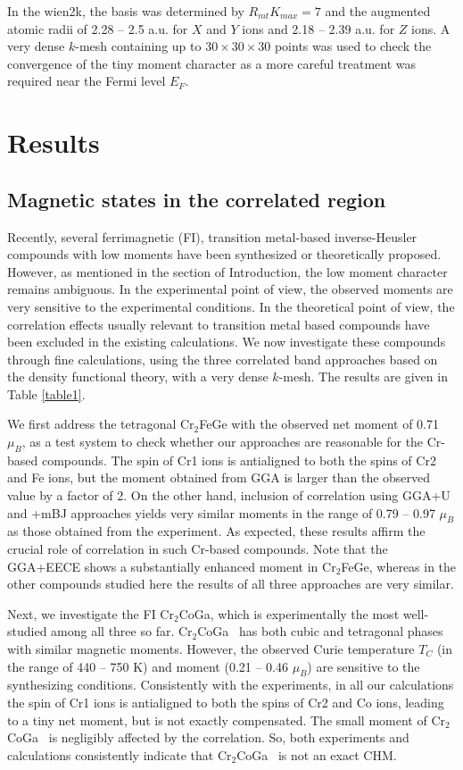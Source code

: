 \documentclass[preprint,5p]{elsarticle}
\newcommand{\ccg}{Cr$_2$CoGa}
\begin{document}
In the {\sc wien2k}, the basis was determined by $R_{mt}K_{max}=7$ 
and the augmented atomic radii of 2.28 -- 2.5 a.u. for $X$ and $Y$ ions and 2.18 -- 2.39 a.u. for $Z$ ions.
A very dense $k$-mesh containing up to $30\times30\times30$ points was used
to check the convergence of the tiny moment character 
as a more careful treatment was required near the Fermi level $E_F$.




\section{Results}

\subsection{Magnetic states in the correlated region}
Recently, several ferrimagnetic (FI), transition metal-based inverse-Heusler compounds 
with low moments have been synthesized or theoretically proposed.
However, as mentioned in the section of Introduction, 
the low moment character remains ambiguous.
In the experimental point of view,
the observed moments are very sensitive to the experimental conditions.
In the theoretical point of view,
the correlation effects usually relevant to transition metal based compounds 
have been excluded in the existing calculations.
We now investigate these compounds through fine calculations, 
using the three correlated band approaches based on the density functional theory,
with a very dense $k$-mesh. The results are given in Table \ref{table1}.

We first address the tetragonal Cr$_2$FeGe with the observed net moment of 0.71 $\mu_B$,\cite{hak13}
as a test system to check whether our approaches are reasonable for the Cr-based compounds.
The spin of Cr1 ions is antialigned to both the spins of Cr2 and Fe ions,
but the moment obtained from GGA is larger than the observed value by a factor of 2.
On the other hand, inclusion of correlation using GGA+U and +mBJ approaches 
yields very similar moments in the range of 0.79 -- 0.97 $\mu_B$ 
as those obtained from the experiment.
As expected, these results affirm the crucial role of correlation in such Cr-based compounds.
Note that the GGA+EECE shows a substantially enhanced moment in Cr$_2$FeGe, 
whereas in the other compounds studied here the results of all three approaches are very similar.

Next, we investigate the FI \ccg, which is experimentally the most well-studied among all three so far. 
\ccg~ has both cubic and tetragonal phases with similar magnetic moments.\cite{feng15, deka16,jamer16}
However, the observed Curie temperature $T_C$ (in the range of 440 -- 750 K) 
and moment (0.21 -- 0.46 $\mu_B$) are sensitive to the synthesizing conditions.\cite{jamer16}
Consistently with the experiments, 
in all our calculations the spin of Cr1 ions is antialigned to both the spins of Cr2 and Co ions,
leading to a tiny net moment, but is not exactly compensated.
The small moment of \ccg~ is negligibly affected by the correlation.
So, both experiments and calculations consistently indicate that \ccg~ is not an exact CHM.
\end{document}
